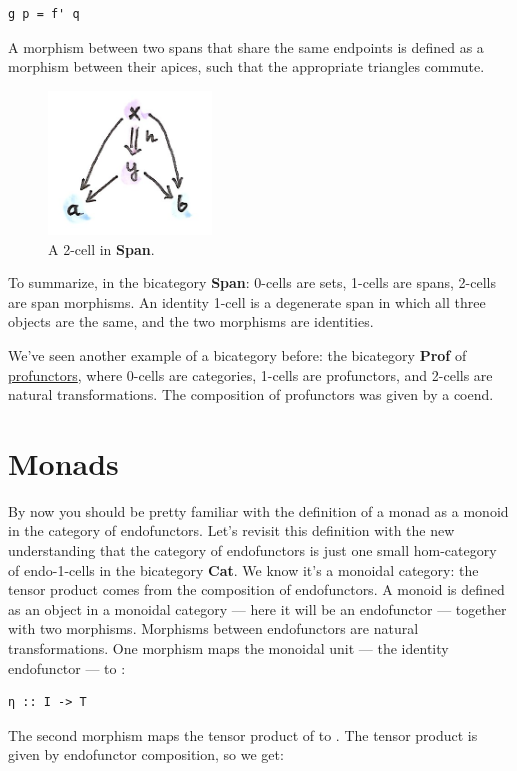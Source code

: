 \begin{Verbatim}[commandchars=\\\{\}]
g p = f' q
\end{Verbatim}
A morphism between two spans that share the same endpoints is defined as
a morphism  between their apices, such that the appropriate
triangles commute.

\begin{figure}[H]
\centering
\includegraphics[width=1.70833in]{images/morphspan.png}
\caption{A 2-cell in \textbf{Span}.}
\end{figure}

\noindent
To summarize, in the bicategory \textbf{Span}: 0-cells are sets, 1-cells
are spans, 2-cells are span morphisms. An identity 1-cell is a
degenerate span in which all three objects are the same, and the two
morphisms are identities.

We've seen another example of a bicategory before: the bicategory
\textbf{Prof} of
\hyperref[ends-and-coends]{profunctors},
where 0-cells are categories, 1-cells are profunctors, and 2-cells are
natural transformations. The composition of profunctors was given by a
coend.

\section{Monads}\label{monads}

By now you should be pretty familiar with the definition of a monad as a
monoid in the category of endofunctors. Let's revisit this definition
with the new understanding that the category of endofunctors is just one
small hom-category of endo-1-cells in the bicategory \textbf{Cat}. We
know it's a monoidal category: the tensor product comes from the
composition of endofunctors. A monoid is defined as an object in a
monoidal category --- here it will be an endofunctor  ---
together with two morphisms. Morphisms between endofunctors are natural
transformations. One morphism maps the monoidal unit --- the identity
endofunctor --- to :

\begin{Verbatim}[commandchars=\\\{\}]
η :: I -> T
\end{Verbatim}
The second morphism maps the tensor product of  to
. The tensor product is given by endofunctor composition, so
we get:

